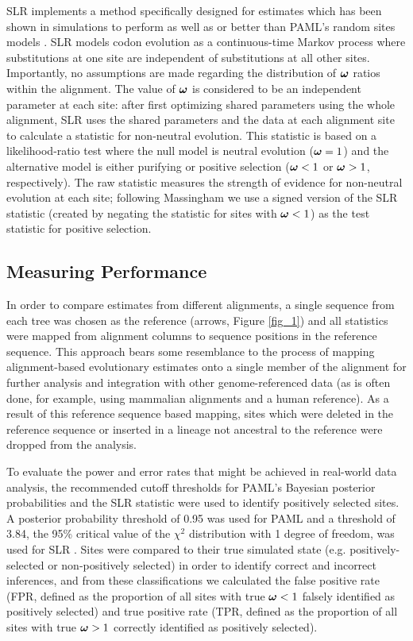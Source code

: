 \documentclass{mbe}
\begin{document}
SLR implements a method specifically designed for \sw estimates which
has been shown in simulations to perform as well as or better than
PAML's \sw random sites models \citep{Massingham2005Detecting}. SLR
models codon evolution as a continuous-time Markov process where
substitutions at one site are independent of substitutions at all
other sites. Importantly, no assumptions are made regarding the
distribution of $\bm{\omega}$ ratios within the alignment. The value of
$\bm{\omega}$ is considered to be an independent parameter at each site:
after first optimizing shared parameters using the whole alignment,
SLR uses the shared parameters and the data at each alignment site to
calculate a \sw statistic for non-neutral evolution. This statistic is
based on a likelihood-ratio test where the null model is neutral
evolution ($\bm{\omega}=1$) and the alternative model is either purifying or
positive selection ($\bm{\omega}<1$ or $\bm{\omega}>1$, respectively). The raw
statistic measures the strength of evidence for non-neutral evolution
at each site; following Massingham
\citeyearpar{Massingham2005Detecting} we use a signed version of the
SLR statistic (created by negating the statistic for sites with
$\bm{\omega}<1$) as the test statistic for positive selection.

\subsection*{Measuring Performance}

In order to compare \sw estimates from different alignments, a single
sequence from each tree was chosen as the reference (arrows, Figure
\ref{fig_1}) and all \sw statistics were mapped from alignment columns
to sequence positions in the reference sequence. This approach bears
some resemblance to the process of mapping alignment-based
evolutionary estimates onto a single member of the alignment for
further analysis and integration with other genome-referenced data (as
is often done, for example, using mammalian alignments and a human
reference). As a result of this reference sequence based mapping,
sites which were deleted in the reference sequence or inserted in a
lineage not ancestral to the reference were dropped from the analysis.

To evaluate the power and error rates that might be achieved in
real-world data analysis, the recommended cutoff thresholds for PAML’s
Bayesian posterior probabilities and the SLR statistic were used to
identify positively selected sites. A posterior probability threshold
of 0.95 was used for PAML \citep{Yang2005Bayes} and a threshold of 3.84,
the 95\% critical value of the $\chi^2$ distribution with 1 degree
of freedom, was used for SLR \citep{Massingham2005Detecting}. Sites were
compared to their true simulated state (e.g. positively-selected or
non-positively selected) in order to identify correct and incorrect
inferences, and from these classifications we calculated the false
positive rate (FPR, defined as the proportion of all sites with true
$\bm{\omega}<1$ falsely identified as positively selected) and true positive rate
(TPR, defined as the proportion of all sites with true $\bm{\omega}>1$ correctly
identified as positively selected).
\end{document}

